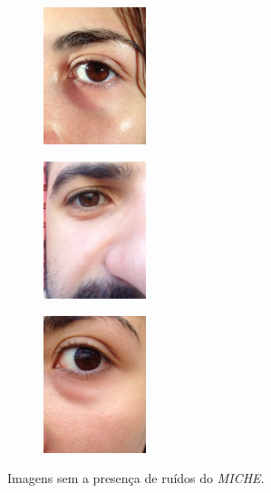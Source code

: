 \begin{figure}[h!]
\begin{subfigure}{.3\textwidth}
\centering
\includegraphics[width=3cm,height=4cm]{img/Resultados/miche/boa_1.jpg}
\end{subfigure}\hfill
\begin{subfigure}{.3\textwidth}
\centering
\includegraphics[width=3cm,height=4cm]{img/Resultados/miche/boa_2.jpg}
\end{subfigure}\hfill
\begin{subfigure}{.3\textwidth}
\centering
\includegraphics[width=3cm,height=4cm]{img/Resultados/miche/boa_3.jpg}
\end{subfigure}
\caption{Imagens sem a presença de ruídos do \textit{MICHE}.}
\label{fig:experimentos:miche_boas}
\end{figure}


